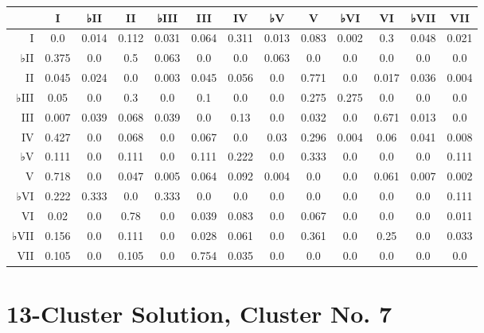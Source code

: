 \begin{table}[htbp]
\begin{minipage}{\linewidth}
\setlength{\tymax}{0.5\linewidth}
\centering
\small
\begin{tabulary}{\textwidth}{@{}RCCCCCCCCCCCC@{}} \toprule
&I&♭II&II&♭III&III&IV&♭V&V&♭VI&VI&♭VII&VII\\
\midrule
I&0.0&0.014&0.112&0.031&0.064&0.311&0.013&0.083&0.002&0.3&0.048&0.021\\
♭II&0.375&0.0&0.5&0.063&0.0&0.0&0.063&0.0&0.0&0.0&0.0&0.0\\
II&0.045&0.024&0.0&0.003&0.045&0.056&0.0&0.771&0.0&0.017&0.036&0.004\\
♭III&0.05&0.0&0.3&0.0&0.1&0.0&0.0&0.275&0.275&0.0&0.0&0.0\\
III&0.007&0.039&0.068&0.039&0.0&0.13&0.0&0.032&0.0&0.671&0.013&0.0\\
IV&0.427&0.0&0.068&0.0&0.067&0.0&0.03&0.296&0.004&0.06&0.041&0.008\\
♭V&0.111&0.0&0.111&0.0&0.111&0.222&0.0&0.333&0.0&0.0&0.0&0.111\\
V&0.718&0.0&0.047&0.005&0.064&0.092&0.004&0.0&0.0&0.061&0.007&0.002\\
♭VI&0.222&0.333&0.0&0.333&0.0&0.0&0.0&0.0&0.0&0.0&0.0&0.111\\
VI&0.02&0.0&0.78&0.0&0.039&0.083&0.0&0.067&0.0&0.0&0.0&0.011\\
♭VII&0.156&0.0&0.111&0.0&0.028&0.061&0.0&0.361&0.0&0.25&0.0&0.033\\
VII&0.105&0.0&0.105&0.0&0.754&0.035&0.0&0.0&0.0&0.0&0.0&0.0\\

\bottomrule

\end{tabulary}
\end{minipage}
\end{table}

\section{13-Cluster Solution, Cluster No. 7}
\label{13-clustersolutionclusterno.7}

